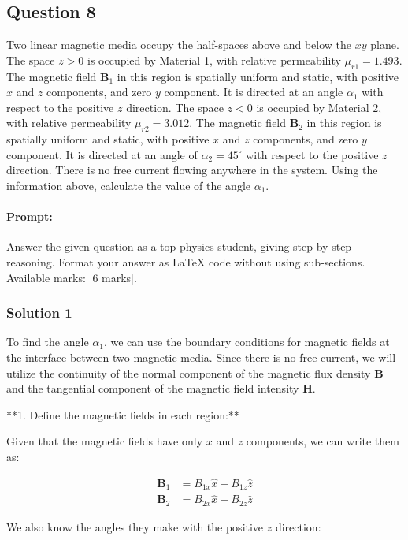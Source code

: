 \documentclass{article}
\begin{document}
\subsection{Question 8}
 Two linear magnetic media occupy the half-spaces above and below the $xy$ plane. The space $z > 0$ is occupied by Material 1, with relative permeability $\mu_{r1} = 1.493$. The magnetic field $\mathbf{B}_1$ in this region is spatially uniform and static, with positive $x$ and $z$ components, and zero $y$ component. It is directed at an angle $\alpha_1$ with respect to the positive $z$ direction. The space $z < 0$ is occupied by Material 2, with relative permeability $\mu_{r2} = 3.012$. The magnetic field $\mathbf{B}_2$ in this region is spatially uniform and static, with positive $x$ and $z$ components, and zero $y$ component. It is directed at an angle of $\alpha_2 = 45^\circ$ with respect to the positive $z$ direction. There is no free current flowing anywhere in the system. Using the information above, calculate the value of the angle $\alpha_1$.


\paragraph{Prompt: \\} 
Answer the given question as a top physics student, giving step-by-step reasoning. Format your answer as LaTeX code without using sub-sections. Available marks: [6 marks].

\subsubsection{Solution 1}
To find the angle $\alpha_1$, we can use the boundary conditions for magnetic fields at the interface between two magnetic media. Since there is no free current, we will utilize the continuity of the normal component of the magnetic flux density $\mathbf{B}$ and the tangential component of the magnetic field intensity $\mathbf{H}$.

**1. Define the magnetic fields in each region:**

Given that the magnetic fields have only $x$ and $z$ components, we can write them as:

\begin{align*}
\mathbf{B}_1 &= B_{1x} \hat{x} + B_{1z} \hat{z} \\
\mathbf{B}_2 &= B_{2x} \hat{x} + B_{2z} \hat{z}
\end{align*}

We also know the angles they make with the positive $z$ direction:
\end{document}
